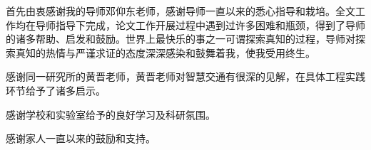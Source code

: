 \begin{acknowledgement}
  首先由衷感谢我的导师邓仰东老师，感谢导师一直以来的悉心指导和栽培。全文工作均在导师指导下完成，论文工作开展过程中遇到过许多困难和瓶颈，得到了导师的诸多帮助、启发和鼓励。世界上最快乐的事之一可谓探索真知的过程，导师对探索真知的热情与严谨求证的态度深深感染和鼓舞着我，使我受用终生。

  感谢同一研究所的黄晋老师，黄晋老师对智慧交通有很深的见解，在具体工程实践环节给予了诸多启示。

  感谢学校和实验室给予的良好学习及科研氛围。

  感谢家人一直以来的鼓励和支持。



\end{acknowledgement}
